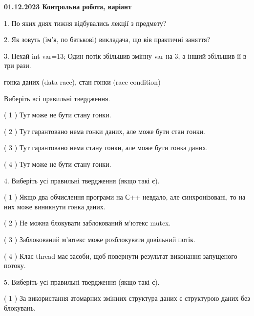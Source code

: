 \documentclass[12pt, ukrainian]{article}
\begin{document}
\vspace{4mm}
\newpage
\begin {large}

\textbf{01.12.2023 Контрольна робота, варіант  }\par


{
1. По яких днях тижня відбувались лекції з предмету?



\vspace{5mm}
2. Як зовуть (ім'я, по батькові) викладача, що вів практичні заняття?



\vspace{5mm}
3. Нехай int var=13; Один потік збільшив змінну var на 3, а інший збільшив її в три рази.

гонка даних (data race), стан гонки (race condition)

Виберіть всі правильні твердження.\par
\vspace{2mm}
( 1 ) Тут може не бути стану гонки.%

( 2 ) Тут гарантовано нема гонки даних, але може бути стан гонки.%

( 3 ) Тут гарантовано нема стану гонки, але може бути гонка даних.%

( 4 ) Тут може не бути стану гонки.%


\vspace{5mm}
4. Виберіть усі правильні твердження (якщо такі є).\par
\vspace{2mm}

( 1 ) Якщо два обчислення програми на С++ невдало, але синхронізовані, то на них може виникнути гонка даних.%

( 2 ) Не можна блокувати заблокований м’ютекс mutex.%

( 3 ) Заблокований м’ютекс може розблокувати довільний потік.%

( 4 ) Клас thread має засоби, щоб повернути результат виконання запущеного потоку.%


\vspace{5mm}
5. Виберіть усі правильні твердження (якщо такі є).\par
\vspace{2mm}

( 1 ) За використання атомарних змінних структура даних є структурою даних без блокувань.%

}
\end{large}
\end{document}
